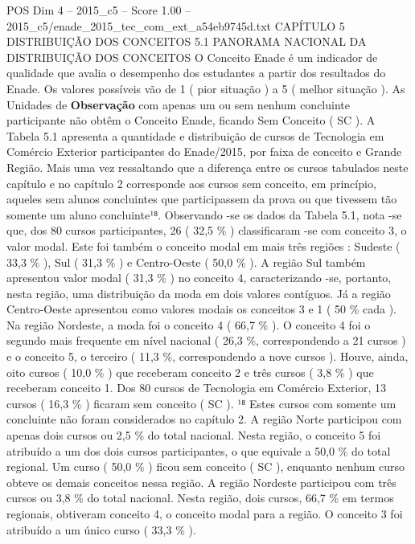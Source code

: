 \begin{textsample}{POS Dim 4 – 2015\_c5 – Score 1.00 – 2015\_c5/enade\_2015\_tec\_com\_ext\_a54eb9745d.txt}  \label{ex:f4_pos_170}
CAPÍTULO 5 DISTRIBUIÇÃO DOS CONCEITOS 5.1 PANORAMA NACIONAL DA DISTRIBUIÇÃO DOS CONCEITOS O Conceito Enade é um indicador de qualidade que avalia o desempenho dos estudantes a partir dos resultados do Enade.
Os valores possíveis vão de 1 ( pior situação ) a 5 ( melhor situação ).
As Unidades de \textbf{Observação} com apenas um ou sem nenhum concluinte participante não obtêm o Conceito Enade, ficando Sem Conceito ( SC ).
A Tabela 5.1 apresenta a quantidade e distribuição de cursos de Tecnologia em Comércio Exterior participantes do Enade/2015, por faixa de conceito e Grande Região.
Mais uma vez ressaltando que a diferença entre os cursos tabulados neste capítulo e no capítulo 2 corresponde aos cursos sem conceito, em princípio, aqueles sem alunos concluintes que participassem da prova ou que tivessem tão somente um aluno concluinte¹⁸.
Observando -se os dados da Tabela 5.1, nota -se que, dos 80 cursos participantes, 26 ( 32,5 \% ) classificaram -se com conceito 3, o valor modal.
Este foi também o conceito modal em mais três regiões : Sudeste ( 33,3 \% ), Sul ( 31,3 \% ) e Centro-Oeste ( 50,0 \% ).
A região Sul também apresentou valor modal ( 31,3 \% ) no conceito 4, caracterizando -se, portanto, nesta região, uma distribuição da moda em dois valores contíguos.
Já a região Centro-Oeste apresentou como valores modais os conceitos 3 e 1 ( 50 \% cada ).
Na região Nordeste, a moda foi o conceito 4 ( 66,7 \% ).
O conceito 4 foi o segundo mais frequente em nível nacional ( 26,3 \%, correspondendo a 21 cursos ) e o conceito 5, o terceiro ( 11,3 \%, correspondendo a nove cursos ).
Houve, ainda, oito cursos ( 10,0 \% ) que receberam conceito 2 e três cursos ( 3,8 \% ) que receberam conceito 1.
Dos 80 cursos de Tecnologia em Comércio Exterior, 13 cursos ( 16,3 \% ) ficaram sem conceito ( SC ). ¹⁸ Estes cursos com somente um concluinte não foram considerados no capítulo 2.
A região Norte participou com apenas dois cursos ou 2,5 \% do total nacional.
Nesta região, o conceito 5 foi atribuído a um dos dois cursos participantes, o que equivale a 50,0 \% do total regional.
Um curso ( 50,0 \% ) ficou sem conceito ( SC ), enquanto nenhum curso obteve os demais conceitos nessa região.
A região Nordeste participou com três cursos ou 3,8 \% do total nacional.
Nesta região, dois cursos, 66,7 \% em termos regionais, obtiveram conceito 4, o conceito modal para a região.
O conceito 3 foi atribuído a um único curso ( 33,3 \% ).

\end{textsample}
